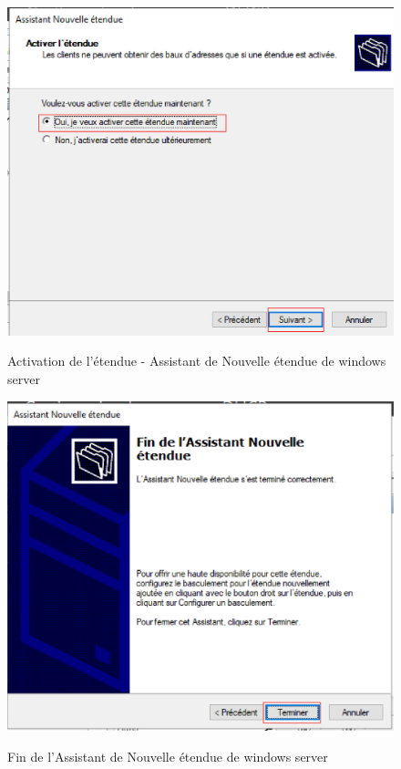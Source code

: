 \begin{figure}[h!]
	\begin{center}
		\caption{Activation de l'étendue - Assistant de Nouvelle étendue de windows server}
		\includegraphics[scale=0.8]{WS_Screenshots/47.png}
		\label{Funcs_WinS/19}
	\end{center}
\end{figure}
\FloatBarrier 
    

\begin{figure}[h!]
	\begin{center}
		\caption{Fin de l'Assistant de Nouvelle étendue de windows server}
		\includegraphics[scale=0.8]{WS_Screenshots/48.png}
		\label{Funcs_WinS/20}
	\end{center}
\end{figure}
\FloatBarrier 
    
